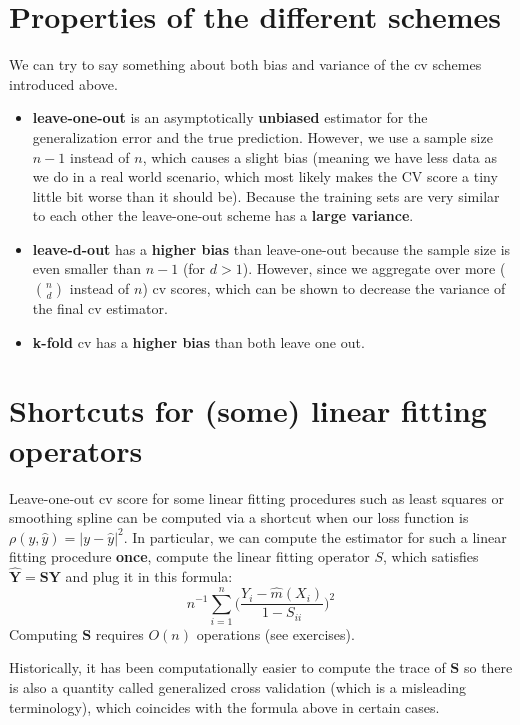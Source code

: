 \documentclass[]{book}
\providecommand{\tightlist}{%
  \setlength{\itemsep}{0pt}\setlength{\parskip}{0pt}}
\begin{document}
\section{Properties of the different
schemes}\label{properties-of-the-different-schemes}

We can try to say something about both bias and variance of the cv
schemes introduced above.

\begin{itemize}
\tightlist
\item
  \textbf{leave-one-out} is an asymptotically \textbf{unbiased}
  estimator for the generalization error and the true prediction.
  However, we use a sample size \(n-1\) instead of \(n\), which causes a
  slight bias (meaning we have less data as we do in a real world
  scenario, which most likely makes the CV score a tiny little bit worse
  than it should be). Because the training sets are very similar to each
  other the leave-one-out scheme has a \textbf{large variance}.
\item
  \textbf{leave-d-out} has a \textbf{higher bias} than leave-one-out
  because the sample size is even smaller than \(n-1\) (for \(d>1\)).
  However, since we aggregate over more (\(\binom{n}{d}\) instead of
  \(n\)) cv scores, which can be shown to decrease the variance of the
  final cv estimator.
\item
  \textbf{k-fold} cv has a \textbf{higher bias} than both leave one out.
\end{itemize}

\section{Shortcuts for (some) linear fitting
operators}\label{shortcuts-for-some-linear-fitting-operators}

Leave-one-out cv score for some linear fitting procedures such as least
squares or smoothing spline can be computed via a shortcut when our loss
function is \(\rho(y, \hat{y}) = |y-\hat{y}|^2\). In particular, we can
compute the estimator for such a linear fitting procedure \textbf{once},
compute the linear fitting operator \(S\), which satisfies
\(\mathbf{\hat{Y}} = \mathbf{SY}\) and plug it in this formula:
\[n^{-1}\sum\limits_{i = 1}^n \Bigg(\frac{Y_i - \hat{m}(X_i)}{1-S_{ii}}\Bigg)^2\]
Computing \(\mathbf{S}\) requires \(O(n)\) operations (see exercises).

Historically, it has been computationally easier to compute the trace of
\(\mathbf{S}\) so there is also a quantity called generalized cross
validation (which is a misleading terminology), which coincides with the
formula above in certain cases.
\end{document}
